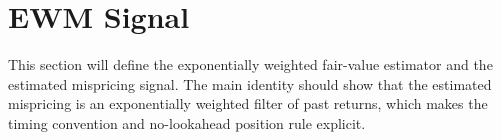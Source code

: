 \section{EWM Signal}

This section will define the exponentially weighted fair-value estimator and the estimated mispricing signal. The main identity should show that the estimated mispricing is an exponentially weighted filter of past returns, which makes the timing convention and no-lookahead position rule explicit.
